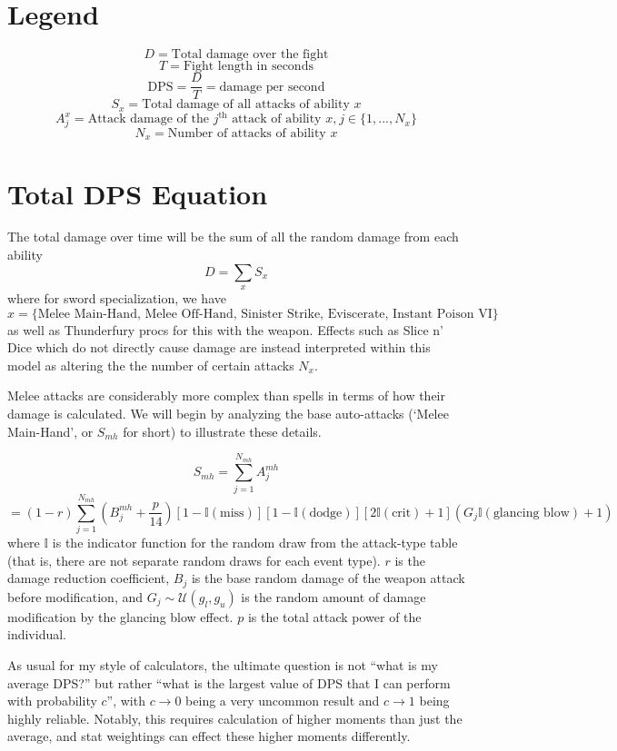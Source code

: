 
\section*{Legend}
$$
D = \text{Total damage over the fight}
$$
$$
T = \text{Fight length in seconds}
$$
$$
\text{DPS} = \frac{D}{T} = \text{damage per second}
$$
$$
S_x = \text{Total damage of all attacks of ability $x$}
$$
$$
A_j^x = \text{Attack damage of the $j^\text{th}$ attack of ability $x$,} \ j \in \{ 1, ..., N_x \}
$$
$$
N_x = \text{Number of attacks of ability $x$}
$$


\section*{Total DPS Equation}
%
The total damage over time will be the sum of all the random damage from each ability
%
$$
D = \sum_{x} S_x
$$
%
where for sword specialization, we have
%
$$
x = \{ \text{Melee Main-Hand, Melee Off-Hand, Sinister Strike, Eviscerate, Instant Poison VI} \}
$$
%
as well as Thunderfury procs for this with the weapon. Effects such as Slice n' Dice which do not directly cause damage are instead interpreted within this model as altering the the number of certain attacks $N_x$.

Melee attacks are considerably more complex than spells in terms of how their damage is calculated. We will begin by analyzing the base auto-attacks (`Melee Main-Hand', or $S_{mh}$ for short) to illustrate these details.

$$
S_{mh} = \sum_{j=1}^{N_{mh}} A_j^{mh}
$$
$$
= (1 - r) \sum_{j=1}^{N_{mh}} (B_j^{mh} + \frac{p}{14}) [1 - \mathbb{I}(\text{miss})] [1 - \mathbb{I}(\text{dodge})] [2 \mathbb{I}(\text{crit}) + 1] (G_j \mathbb{I}(\text{glancing blow}) + 1)
$$
%
where $\mathbb{I}$ is the indicator function for the random draw from the attack-type table (that is, there are not separate random draws for each event type). $r$ is the damage reduction coefficient, $B_j$ is the base random damage of the weapon attack before modification, and $G_j \sim \mathcal{U}(g_l, g_u)$ is the random amount of damage modification by the glancing blow effect. $p$ is the total attack power of the individual.

As usual for my style of calculators, the ultimate question is not ``what is my average DPS?'' but rather ``what is the largest value of DPS that I can perform with probability $c$'', with $c \rightarrow 0$ being a very uncommon result and $c \rightarrow 1$ being highly reliable. Notably, this requires calculation of higher moments than just the average, and stat weightings can effect these higher moments differently.





